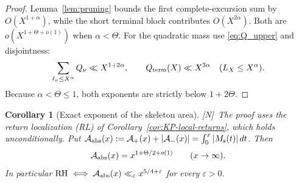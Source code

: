 \documentclass[11pt,reqno]{amsart}
\numberwithin{equation}{section}
\theoremstyle{plain}
\newtheorem{corollary}[theorem]{Corollary}
\theoremstyle{definition}
\theoremstyle{remark}
\newcommand{\Ms}{M_{\mathrm{s}}}
\newcommand{\Ap}{\mathcal{A}_{+}}
\newcommand{\Am}{\mathcal{A}_{-}}
\newcommand{\eps}{\varepsilon}
\newcommand{\tagN}{\textup{[N]}}
\begin{document}
\begin{proof}
Lemma~\ref{lem:pruning} bounds the first complete-excursion sum by
$O(X^{1+\alpha})$, while the short terminal block contributes
$O(X^{2\alpha})$.  Both are $o(X^{1+\Theta+o(1)})$ when $\alpha<\Theta$.
For the quadratic mass use \eqref{eq:Q_upper} and disjointness:
\begin{equation}
 \sum_{\ell_\nu\le X^\alpha}Q_\nu\ll X^{1+2\alpha},
 \qquad
 Q_{\rm term}(X)\ll X^{3\alpha}
 \quad(L_X\le X^\alpha).
\end{equation}
Because $\alpha<\Theta\le1$, both exponents are strictly below
$1+2\Theta$.
\end{proof}


\begin{corollary}[Exact exponent of the skeleton area]
\label{cor:area-exponent}
\tagN\ The proof uses the return localization (RL) of
Corollary~\ref{cor:KP-local-returns}, which holds unconditionally. Put $\mathcal A_{\rm abs}(x):=\Ap(x)+|\Am(x)|=\int_0^x|\Ms(t)|\,dt$. Then
\begin{equation}
\mathcal A_{\rm abs}(x)=x^{1+\Theta/2+o(1)}\qquad(x\to\infty).
\end{equation}
In particular $\mathrm{RH}\iff\mathcal A_{\rm abs}(x)\ll_\eps x^{5/4+\eps}$
for every $\eps>0$.
\end{corollary}
\end{document}
